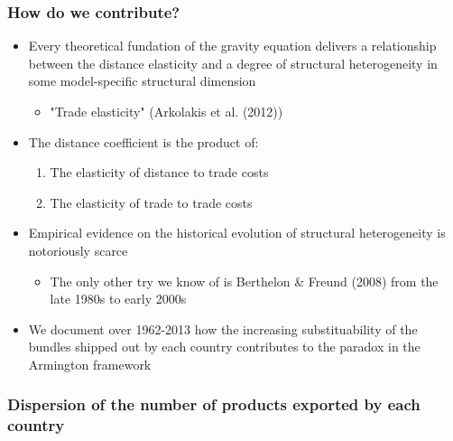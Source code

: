 \documentclass{beamer}
\newcommand{\noteLA}[1]{\textcolor{blue}{\footnotesize\textit{{noteLA: #1}}}} %
\def\noteLA #1{} %
\begin{document}
\begin{frame}[plain]\frametitle{How do we contribute?}
	\noteLA{Say here: world may be getting smaller while at the same time the elasticity of trade to distance may be non-decreasing. This is where ambiguity in distance puzzle appears.}
\begin{itemize}
	\item Every theoretical fundation of the gravity equation delivers a relationship between the distance elasticity and a degree of structural heterogeneity in some model-specific structural dimension
		\begin{itemize}
			\item "Trade elasticity" (Arkolakis et al. (2012))
		\end{itemize}
	\item The distance coefficient is the product of:
	\begin{enumerate}
		\item The elasticity of distance to trade costs
		\item The elasticity of trade to trade costs
	\end{enumerate}
	\item Empirical evidence on the historical evolution of structural heterogeneity is notoriously scarce
		\begin{itemize}
			\item The only other try we know of is Berthelon \& Freund (2008) from the late 1980s to early 2000s
		\end{itemize}
	\item We document over 1962-2013 how the increasing substituability of the bundles shipped out by each country contributes to the paradox in the Armington framework
\end{itemize}
\end{frame}



\begin{frame}[plain]\frametitle{Dispersion of the number of products exported by each country}
\begin{figure}
	\begin{center}
		\setlength{\fboxrule}{1pt} %
		\setlength{\fboxsep}{.1in} %
	\end{center}
\end{figure}
\end{frame}
\end{document}
